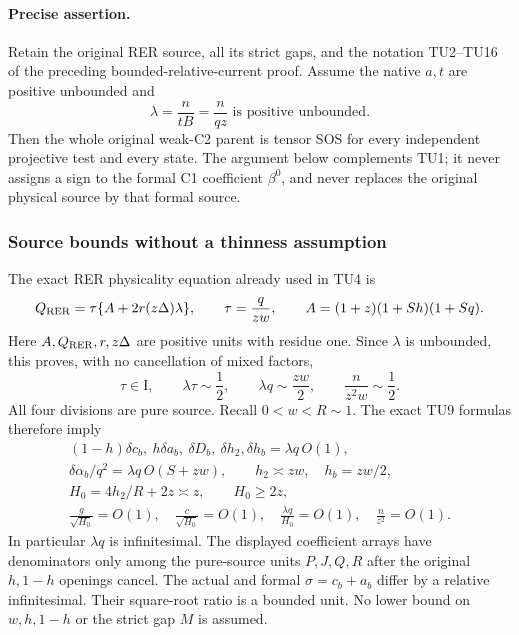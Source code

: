 \label{pef021eabacde:sec:r2-unbounded-current-new}

\paragraph{Precise assertion.}
Retain the original RER source, all its strict gaps, and the notation
TU2--TU16 of the preceding bounded-relative-current proof.
Assume the native $a,t$ are positive unbounded and
\[
             \lambda=\frac{n}{tB}=\frac{n}{qz}
                   \text{ is positive unbounded}.                 \tag{UL1}
\]
Then the whole original weak-C2 parent is tensor SOS for every
independent projective test and every state. The argument below
complements TU1; it never assigns a sign to the formal C1 coefficient
$\beta^0$, and never replaces the original physical source by that
formal source.

\subsubsection*{Source bounds without a thinness assumption}

The exact RER physicality equation already used in TU4 is
\[
 Q_{\rm RER}=\tau\{A+2r(z\Delta)\lambda\},\qquad
 \tau=\frac q{zw},\qquad
 A=(1+z)(1+Sh)(1+Sq).
\]
Here $A,Q_{\rm RER},r,z\Delta$ are positive units with residue one.
Since $\lambda$ is unbounded, this proves, with no cancellation of
mixed factors,
\[
 \tau\in\mathrm I,\qquad \lambda\tau\sim\frac12,\qquad
 \lambda q\sim\frac{zw}{2},\qquad
 \frac n{z^2w}\sim\frac12.                                     \tag{UL2}
\]
All four divisions are pure source. Recall $0<w<R\sim1$.
The exact TU9 formulas therefore imply
\[
\begin{gathered}
 (1-h)\delta c_b,\ h\delta a_b,\ \delta D_b,\
            \delta h_2,\delta h_b=\lambda q\,O(1),\\
 \delta\alpha_b/q^2=\lambda q\,O(S+zw),\qquad
 h_2\asymp zw,\quad h_b=zw/2,\\
 H_0=4h_2/R+2z\asymp z,\qquad H_0\geq2z,\\
 \frac g{\sqrt{H_0}}=O(1),\quad
 \frac c{\sqrt{H_0}}=O(1),\quad
 \frac{\lambda q}{H_0}=O(1),\quad \frac n{z^2}=O(1).
\end{gathered}                                                   \tag{UL3}
\]
In particular $\lambda q$ is infinitesimal. The displayed coefficient
arrays have denominators only among the pure-source units
$P,J,Q,R$ after the original $h,1-h$ openings cancel.
The actual and formal $\sigma=c_b+a_b$ differ by a relative
infinitesimal. Their square-root ratio is a bounded unit.
No lower bound on $w,h,1-h$ or the strict gap $M$ is assumed.

